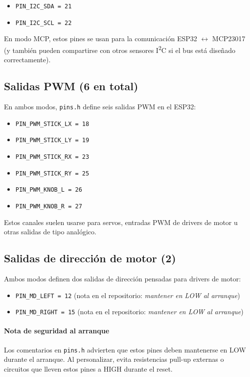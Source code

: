 \begin{itemize}
    \item \texttt{PIN\_I2C\_SDA = 21}
    \item \texttt{PIN\_I2C\_SCL = 22}
\end{itemize}

En modo MCP, estos pines se usan para la comunicación ESP32 $\leftrightarrow$ MCP23017 (y también pueden compartirse con otros
sensores I\textsuperscript{2}C si el bus está diseñado correctamente).

\subsection{Salidas PWM (6 en total)}
En ambos modos, \texttt{pins.h} define seis salidas PWM en el ESP32:

\begin{itemize}
    \item \texttt{PIN\_PWM\_STICK\_LX = 18}
    \item \texttt{PIN\_PWM\_STICK\_LY = 19}
    \item \texttt{PIN\_PWM\_STICK\_RX = 23}
    \item \texttt{PIN\_PWM\_STICK\_RY = 25}
    \item \texttt{PIN\_PWM\_KNOB\_L = 26}
    \item \texttt{PIN\_PWM\_KNOB\_R = 27}
\end{itemize}

Estos canales suelen usarse para servos, entradas PWM de drivers de motor u otras salidas de tipo analógico.

\subsection{Salidas de dirección de motor (2)}
Ambos modos definen dos salidas de dirección pensadas para drivers de motor:

\begin{itemize}
    \item \texttt{PIN\_MD\_LEFT = 12} \quad (nota en el repositorio: \emph{mantener en LOW al arranque})
    \item \texttt{PIN\_MD\_RIGHT = 15} \quad (nota en el repositorio: \emph{mantener en LOW al arranque})
\end{itemize}

\paragraph{Nota de seguridad al arranque}
Los comentarios en \texttt{pins.h} advierten que estos pines deben mantenerse en LOW durante el arranque. Al personalizar,
evita resistencias pull-up externas o circuitos que lleven estos pines a HIGH durante el reset.

